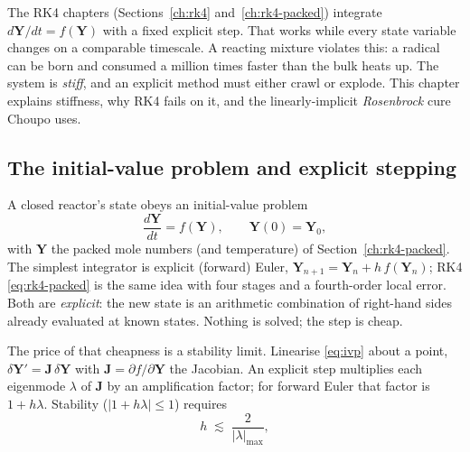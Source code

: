 \documentclass[11pt,a4paper]{article}
\newcommand{\Jac}{\mathbf{J}}
\newcommand{\Yv}{\mathbf{Y}}                          %
\begin{document}
\begin{whatyoulllearn}
The RK4 chapters (Sections~\ref{ch:rk4} and~\ref{ch:rk4-packed})
integrate $d\Yv/dt = f(\Yv)$ with a fixed explicit step.  That works
while every state variable changes on a comparable timescale.  A
reacting mixture violates this: a radical can be born and consumed a
million times faster than the bulk heats up.  The system is
\emph{stiff}, and an explicit method must either crawl or explode.
This chapter explains stiffness, why RK4 fails on it, and the
linearly-implicit \emph{Rosenbrock} cure Choupo uses.
\end{whatyoulllearn}

\subsection{The initial-value problem and explicit stepping}

A closed reactor's state obeys an initial-value problem
\begin{equation}
    \frac{d\Yv}{dt} = f(\Yv), \qquad \Yv(0) = \Yv_0,
    \label{eq:ivp}
\end{equation}
with $\Yv$ the packed mole numbers (and temperature) of
Section~\ref{ch:rk4-packed}.  The simplest integrator is explicit
(forward) Euler, $\Yv_{n+1} = \Yv_n + h\,f(\Yv_n)$; RK4
\eqref{eq:rk4-packed} is the same idea with four stages and a
fourth-order local error.  Both are \emph{explicit}: the new state is
an arithmetic combination of right-hand sides already evaluated at
known states.  Nothing is solved; the step is cheap.

The price of that cheapness is a stability limit.  Linearise
\eqref{eq:ivp} about a point, $\delta\Yv' = \Jac\,\delta\Yv$ with
$\Jac = \partial f/\partial \Yv$ the Jacobian.  An explicit step
multiplies each eigenmode $\lambda$ of $\Jac$ by an amplification
factor; for forward Euler that factor is $1 + h\lambda$.  Stability
($|1+h\lambda|\le 1$) requires
\begin{equation}
    h \;\lesssim\; \frac{2}{|\lambda|_{\max}},
    \label{eq:explicit-step}
\end{equation}
\end{document}
